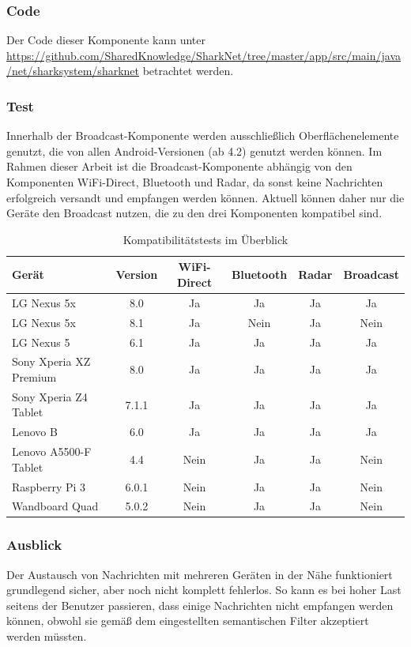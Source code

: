 \subsubsection{Code}
Der Code dieser Komponente kann unter \url{https://github.com/SharedKnowledge/SharkNet/tree/master/app/src/main/java/net/sharksystem/sharknet} betrachtet werden. 

\subsubsection{Test}
Innerhalb der Broadcast-Komponente werden ausschließlich Oberflächenelemente genutzt, die von allen Android-Versionen (ab 4.2) genutzt werden können. Im Rahmen dieser Arbeit ist die Broadcast-Komponente abhängig von den Komponenten WiFi-Direct, Bluetooth und Radar, da sonst keine Nachrichten erfolgreich versandt und empfangen werden können. Aktuell können daher nur die Geräte den Broadcast nutzen, die zu den drei Komponenten kompatibel sind.
\begin{table}[H]
	\begin{center}
		\caption{Kompatibilitätstests im Überblick}
		\label{tab:dimensions}
		\begin{tabular}{l|c|c|c|c|c} 			
			Gerät & Version & WiFi-Direct & Bluetooth & Radar & Broadcast \\
			\hline
			LG Nexus 5x & 8.0 & Ja & Ja & Ja & Ja\\
			LG Nexus 5x & 8.1 & Ja & Nein & Ja & Nein\\
			LG Nexus 5 & 6.1 & Ja & Ja & Ja & Ja\\
			Sony Xperia XZ Premium & 8.0 & Ja & Ja & Ja & Ja\\
			Sony Xperia Z4 Tablet & 7.1.1 & Ja & Ja & Ja & Ja\\
			Lenovo B & 6.0 & Ja & Ja & Ja & Ja\\
			Lenovo A5500-F Tablet & 4.4 & Nein & Ja & Ja & Nein\\
			Raspberry Pi 3 & 6.0.1 & Nein & Ja & Ja & Nein\\	
			Wandboard Quad & 5.0.2 & Nein & Ja & Ja & Nein\\			
		\end{tabular}
	\end{center}
\end{table}
\subsubsection{Ausblick}
Der Austausch von Nachrichten mit mehreren Geräten in der Nähe funktioniert grundlegend sicher, aber noch nicht komplett fehlerlos. So kann es bei hoher Last seitens der Benutzer passieren, dass einige Nachrichten nicht empfangen werden können, obwohl sie gemäß dem eingestellten semantischen Filter akzeptiert werden müssten. 
\newpage
